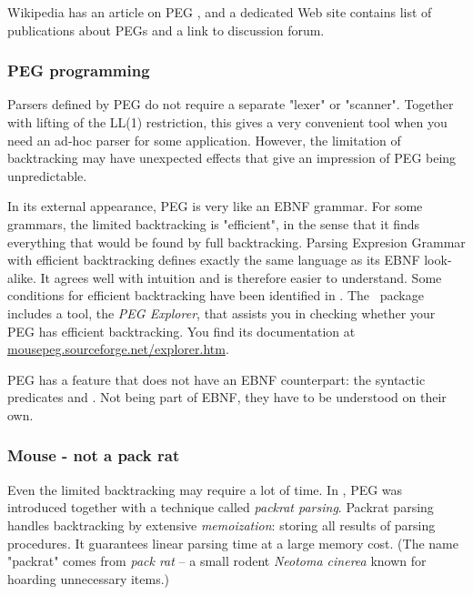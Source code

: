 Wikipedia has an article on PEG \cite{Wiki:PEG},
and a dedicated Web site \cite{PEG} contains 
list of publications about PEGs and a link to discussion forum.

\subsubsection*{PEG programming}

Parsers defined by PEG
do not require a separate "lexer" or "scanner".
Together with lifting of the LL(1) restriction,
this gives a very convenient tool when you need
an ad-hoc parser for some application.
However, the limitation of backtracking may have unexpected effects
that give an impression of PEG being unpredictable.

In its external appearance, PEG is very like an EBNF grammar.
For some grammars, the limited backtracking is "efficient",
in the sense that it finds everything that would be found by full backtracking.
Parsing Expresion Grammar with efficient backtracking 
defines exactly the same language as its EBNF look-alike.
It agrees well with intuition
and is therefore easier to understand.
Some conditions for efficient backtracking have been identified 
in \cite{Redz:2014:FI}.
The \Mouse\ package includes a tool, the \textsl{PEG Explorer},
that assists you in checking whether your PEG has efficient backtracking.
You find its documentation at \url{mousepeg.sourceforge.net/explorer.htm}.

PEG has a feature that does not have an EBNF counterpart:
the syntactic predicates  and .
Not being part of EBNF, they have to be understood on their own.

\subsubsection*{Mouse - not a pack rat}

Even the limited backtracking may require a lot of time.
In \cite{Ford:2002}, PEG was introduced together with
a technique called \emph{packrat parsing}.
Packrat parsing handles backtracking
by extensive \emph{memoization}: storing all results
of parsing procedures.
It guarantees linear parsing time at a large memory cost.
(The name "packrat" comes from \emph{pack rat} -- a small rodent \emph{Neotoma cinerea}  
known for hoarding unnecessary items.)

